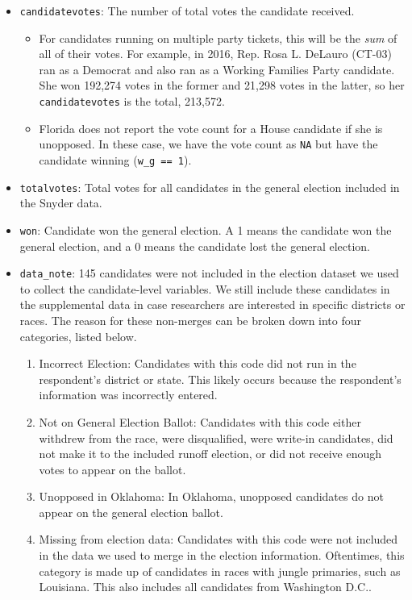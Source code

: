\documentclass[12pt]{article}
\begin{document}
\begin{itemize}[leftmargin=*]
			
			
\item \texttt{candidatevotes}: The number of total votes the candidate received. 
\begin{itemize}
\item For candidates running on multiple party tickets, this will be the \emph{sum} of all of their votes.  For example, in 2016, Rep. Rosa L. DeLauro (CT-03) ran as a Democrat and also ran as a Working Families Party candidate. She won 192,274 votes in the former and 21,298 votes in the latter, so her \texttt{candidatevotes} is the total, 213,572.
\item  Florida does not report the vote count for a House candidate if she is unopposed. In these case, we have the vote count as \texttt{NA} but have the candidate winning (\texttt{w\_g == 1}).
\end{itemize}
				

\item \texttt{totalvotes}: Total votes for all candidates in the general election included in the Snyder data. 

\item \texttt{won}: Candidate won the general election. A 1 means the candidate won the general election, and a 0 means the candidate lost the general election. 

\item \texttt{data\_note}: 145 candidates were not included in the election dataset we used to collect the candidate-level variables. We still include these candidates in the supplemental data in case researchers are interested in specific districts or races. The reason for these non-merges can be broken down into four categories, listed below.
		\begin{enumerate}
			\item Incorrect Election: Candidates with this code  did not run in the respondent's district or state. This likely occurs because the respondent's information was incorrectly entered. 
			\item Not on General Election Ballot: Candidates with this code either withdrew from the race, were disqualified, were write-in candidates, did not make it to the included runoff election, or did not receive enough votes to appear on the ballot. 
			\item Unopposed in Oklahoma: In Oklahoma, unopposed candidates do not appear on the general election ballot. 
			\item Missing from election data: Candidates with this code were not included in the data we used to merge in the election information. Oftentimes, this category is made up of candidates in races with jungle primaries, such as Louisiana. This also includes all candidates from Washington D.C.. 
		\end{enumerate}
\end{itemize}
	
\end{document}
